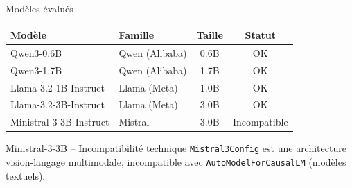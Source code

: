 \documentclass[aspectratio=169, 12pt]{beamer}
\newcommand{\positif}[1]{\textcolor{green!60!black}{#1}}
\newcommand{\negatif}[1]{\textcolor{red!70!black}{#1}}
\begin{document}
\begin{frame}{Mod\`eles \'evalu\'es}
  \begin{table}
    \centering
    \small
    \begin{tabular}{@{} l l c c @{}}
      \toprule
      \textbf{Mod\`ele} & \textbf{Famille} & \textbf{Taille} & \textbf{Statut} \\
      \midrule
      Qwen3-0.6B & Qwen (Alibaba) & 0.6B & \positif{OK} \\
      Qwen3-1.7B & Qwen (Alibaba) & 1.7B & \positif{OK} \\
      Llama-3.2-1B-Instruct & Llama (Meta) & 1.0B & \positif{OK} \\
      Llama-3.2-3B-Instruct & Llama (Meta) & 3.0B & \positif{OK} \\
      Ministral-3-3B-Instruct & Mistral & 3.0B & \negatif{Incompatible} \\
      \bottomrule
    \end{tabular}
  \end{table}

  \vspace{0.2cm}

  \begin{alertblock}{Ministral-3-3B -- Incompatibilit\'e technique}
    \texttt{Mistral3Config} est une architecture vision-langage multimodale, incompatible avec \texttt{AutoModelForCausalLM} (mod\`eles textuels).
  \end{alertblock}
\end{frame}
\end{document}
